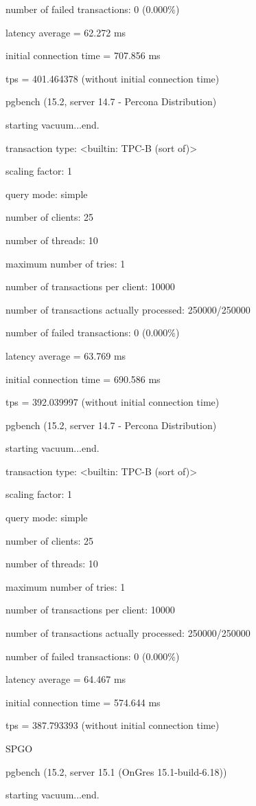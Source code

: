 number of failed transactions: 0 (0.000\%)

latency average = 62.272 ms

initial connection time = 707.856 ms

tps = 401.464378 (without initial connection time)

pgbench (15.2, server 14.7 - Percona Distribution)

starting vacuum...end.

transaction type: <builtin: TPC-B (sort of)>

scaling factor: 1

query mode: simple

number of clients: 25

number of threads: 10

maximum number of tries: 1

number of transactions per client: 10000

number of transactions actually processed: 250000/250000

number of failed transactions: 0 (0.000\%)

latency average = 63.769 ms

initial connection time = 690.586 ms

tps = 392.039997 (without initial connection time)

pgbench (15.2, server 14.7 - Percona Distribution)

starting vacuum...end.

transaction type: <builtin: TPC-B (sort of)>

scaling factor: 1

query mode: simple

number of clients: 25

number of threads: 10

maximum number of tries: 1

number of transactions per client: 10000

number of transactions actually processed: 250000/250000

number of failed transactions: 0 (0.000\%)

latency average = 64.467 ms

initial connection time = 574.644 ms

tps = 387.793393 (without initial connection time)

SPGO

pgbench (15.2, server 15.1 (OnGres 15.1-build-6.18))

starting vacuum...end.


